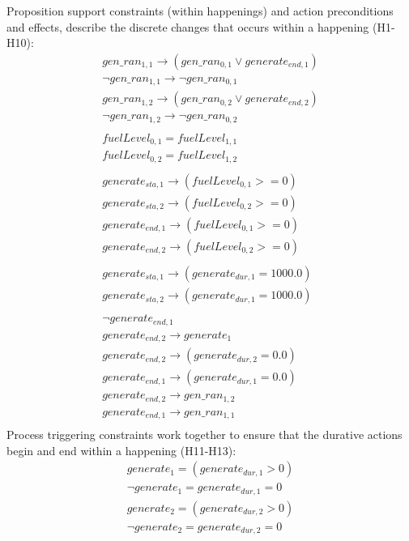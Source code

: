 \noindent Proposition support constraints (within happenings) and action preconditions and effects, describe the discrete changes that occurs within a happening (H1-H10):
$$
\begin{array}{l}
gen\_ran_{1,1} \rightarrow (gen\_ran_{0,1} \vee generate_{end,1}) \\
\neg gen\_ran_{1,1} \rightarrow \neg gen\_ran_{0,1} \\
gen\_ran_{1,2} \rightarrow (gen\_ran_{0,2} \vee generate_{end,2}) \\
\neg gen\_ran_{1,2} \rightarrow \neg gen\_ran_{0,2} \\
\\
fuelLevel_{0,1} = fuelLevel_{1,1} \\
fuelLevel_{0,2} = fuelLevel_{1,2} \\
\\
generate_{sta,1} \rightarrow (fuelLevel_{0,1} >= 0) \\
generate_{sta,2} \rightarrow (fuelLevel_{0,2} >= 0) \\
generate_{end,1} \rightarrow (fuelLevel_{0,1} >= 0) \\
generate_{end,2} \rightarrow (fuelLevel_{0,2} >= 0) \\
\\
generate_{sta,1} \rightarrow (generate_{dur,1} = 1000.0) \\
generate_{sta,2} \rightarrow (generate_{dur,1} = 1000.0) \\
\\
\neg generate_{end,1} \\
generate_{end,2} \rightarrow generate_1 \\
generate_{end,2} \rightarrow (generate_{dur,2} = 0.0) \\
generate_{end,1} \rightarrow (generate_{dur,1} = 0.0) \\
generate_{end,2} \rightarrow gen\_ran_{1,2} \\
generate_{end,1} \rightarrow gen\_ran_{1,1} \\
\end{array}
$$
Process triggering constraints work together to ensure that the durative actions begin and end within a happening (H11-H13):
$$
\begin{array}{l}
generate_1 = (generate_{dur,1} > 0) \\
\neg generate_1 = generate_{dur,1} = 0 \\
generate_2 = (generate_{dur,2} > 0) \\
\neg generate_2 = generate_{dur,2} = 0 \\
\end{array}
$$
